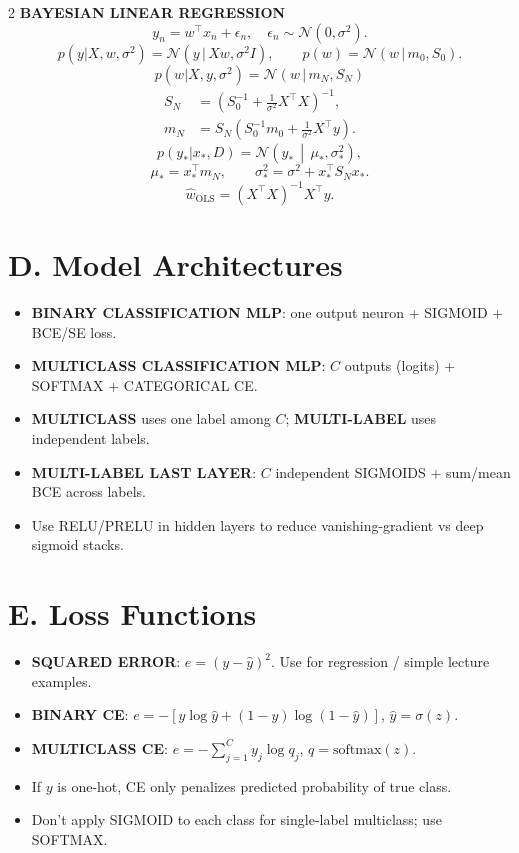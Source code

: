 \documentclass[10pt,fleqn]{article}
\begin{document}
\begin{multicols}{2}
\textbf{BAYESIAN LINEAR REGRESSION}
\[
y_n=w^\top x_n+\epsilon_n,\quad \epsilon_n\sim\mathcal N(0,\sigma^2).
\]
\[
p(y|X,w,\sigma^2)=\mathcal N(y\,|\,Xw,\sigma^2 I),\qquad
p(w)=\mathcal N(w\,|\,m_0,S_0).
\]
\[
p(w|X,y,\sigma^2)=\mathcal N(w\,|\,m_N,S_N)
\]
\[
\begin{aligned}
S_N&=\left(S_0^{-1}+\frac{1}{\sigma^2}X^\top X\right)^{-1},\\
m_N&=S_N\left(S_0^{-1}m_0+\frac{1}{\sigma^2}X^\top y\right).
\end{aligned}
\]
\[
p(y_*|x_*,D)=\mathcal N\!\left(y_*\,\middle|\,\mu_*,\sigma_*^2\right),
\]
\[
\mu_*=x_*^\top m_N,\qquad
\sigma_*^2=\sigma^2+x_*^\top S_N x_*.
\]
\[
\hat w_{\text{OLS}}=(X^\top X)^{-1}X^\top y.
\]

\section*{D. Model Architectures}
\begin{itemize}
  \item \textbf{BINARY CLASSIFICATION MLP}: one output neuron + SIGMOID + BCE/SE loss.
  \item \textbf{MULTICLASS CLASSIFICATION MLP}: \(C\) outputs (logits) + SOFTMAX + CATEGORICAL CE.
  \item \textbf{MULTICLASS} uses one label among \(C\); \textbf{MULTI-LABEL} uses independent labels.
  \item \textbf{MULTI-LABEL LAST LAYER}: \(C\) independent SIGMOIDS + sum/mean BCE across labels.
  \item Use RELU/PRELU in hidden layers to reduce vanishing-gradient vs deep sigmoid stacks.
\end{itemize}

\section*{E. Loss Functions}
\begin{itemize}
  \item \textbf{SQUARED ERROR}: \(e=(y-\hat y)^2\). Use for regression / simple lecture examples.
  \item \textbf{BINARY CE}: \(e=-[y\log\hat y+(1-y)\log(1-\hat y)]\), \(\hat y=\sigma(z)\).
  \item \textbf{MULTICLASS CE}: \(e=-\sum_{j=1}^C y_j\log q_j\), \(q=\text{softmax}(z)\).
  \item If \(y\) is one-hot, CE only penalizes predicted probability of true class.
  \item Don’t apply SIGMOID to each class for single-label multiclass; use SOFTMAX.
\end{itemize}


\end{multicols}
\end{document}
